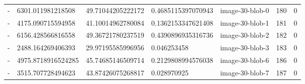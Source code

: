 \documentclass[letterpaper]{article}
\begin{document}
{\begin{tiny}
\begin{longtable}{llllllh}
\bottomrule
\endlastfoot

- &6301.011981218508	&49.71044205222172	&0.4685115397070943	&image-30-blob-0	&180	&0 \\
- &4175.090715594958	&41.10014962780084	&0.1362153347621408	&image-30-blob-1	&181	&0 \\
- &6156.428566816558	&49.36721780237519	&0.4390896935316736	&image-30-blob-2	&182	&0 \\
- &2488.164269406393	&29.97195585996956	&0.046253458	           &image-30-blob-3	&183	&0 \\
- &4975.8718916524285	&45.74685146509714	&0.2129808994576038 &image-30-blob-6	&186	&0 \\
- &3515.707728494623	&43.87426075268817	&0.028970925	           &image-30-blob-7	&187	&0
\end{longtable}
\end{tiny}

%
%
}
\end{document}
